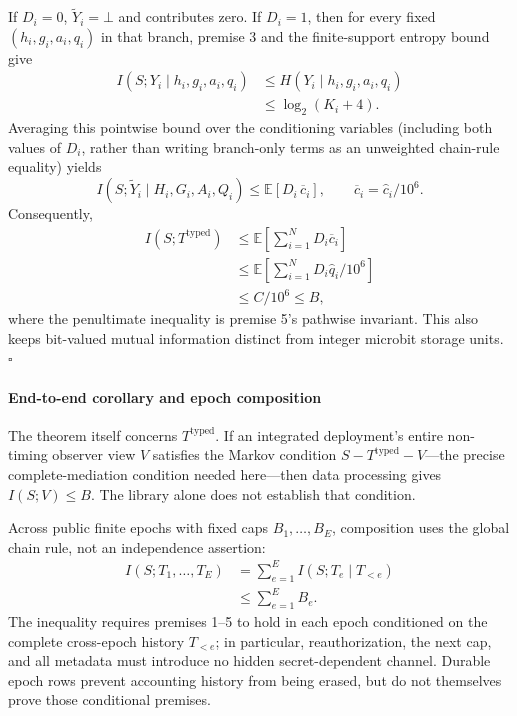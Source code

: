 \documentclass[conference,compsoc]{IEEEtran}
\begin{document}
{If $D_i=0$, $\widetilde Y_i=\bot$ and contributes zero. If $D_i=1$, then
for every fixed $(h_i,g_i,a_i,q_i)$ in that branch, premise 3 and the
finite-support entropy bound give
\begin{align*}
 I(S;Y_i\mid h_i,g_i,a_i,q_i)
 &\le H(Y_i\mid h_i,g_i,a_i,q_i)\\
 &\le\log_2(K_i+4).
\end{align*}
Averaging this pointwise bound over the conditioning variables (including
both values of $D_i$, rather than writing branch-only terms as an
unweighted chain-rule equality) yields
\[
 I(S;\widetilde Y_i\mid H_i,G_i,A_i,Q_i)
 \le \mathbb E[D_i\,\overline c_i],
 \qquad \overline c_i=\widehat c_i/10^6.
\]
Consequently,
\begin{align*}
I(S;T^{\mathrm{typed}})
&\le \mathbb E\!\left[\sum_{i=1}^{N}D_i\overline c_i\right]\\
&\le \mathbb E\!\left[\sum_{i=1}^{N}D_i\widehat q_i/10^6\right]\\
&\le C/10^6\le B,
\end{align*}
where the penultimate inequality is premise 5's pathwise invariant. This
also keeps bit-valued mutual information distinct from integer microbit
storage units. \hfill$\square$

\paragraph{End-to-end corollary and epoch composition}
The theorem itself concerns $T^{\mathrm{typed}}$. If an integrated
deployment's entire non-timing observer view $V$ satisfies the Markov
condition $S\mathbin{-}T^{\mathrm{typed}}\mathbin{-}V$---the precise
complete-mediation condition needed here---then data processing gives
$I(S;V)\le B$. The library alone does not establish that condition.

Across public finite epochs with fixed caps $B_1,\ldots,B_E$, composition
uses the global chain rule, not an independence assertion:
\begin{align*}
 I(S;T_1,\ldots,T_E)
 &=\sum_{e=1}^{E} I(S;T_e\mid T_{<e})\\
 &\le\sum_{e=1}^{E}B_e.
\end{align*}
The inequality requires premises 1--5 to hold in each epoch conditioned on
the complete cross-epoch history $T_{<e}$; in particular, reauthorization,
the next cap, and all metadata must introduce no hidden secret-dependent
channel. Durable epoch rows prevent accounting history from being erased,
but do not themselves prove those conditional premises.

}
\end{document}
